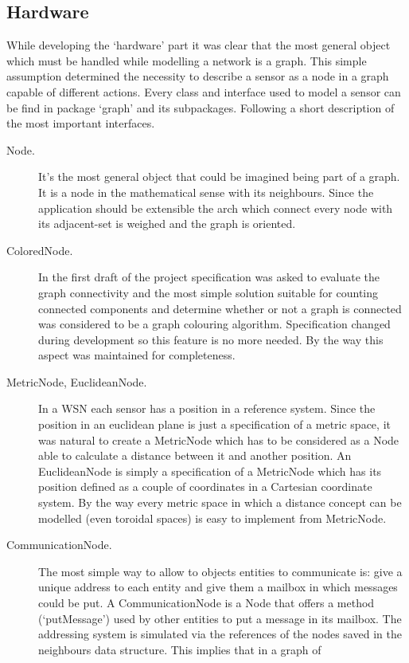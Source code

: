\subsection{Hardware}
While developing the `hardware' part it was clear that the most general object
which must be handled while modelling a network is a graph. This simple
assumption determined the necessity to describe a sensor as a node in a graph
capable of different actions.
Every class and interface used to model a sensor can be find in package `graph'
and its subpackages.
Following a short description of the most important interfaces.
\begin{description}
  \item[Node.] It's the most general object that could be imagined being
  part of a graph. It is a node in the mathematical sense with its 
  neighbours. Since the application should be extensible the arch which connect
  every node with its adjacent-set is weighed and the graph is oriented.
  \item[ColoredNode.] In the first draft of the project specification
  was asked to evaluate the graph connectivity and the most simple
  solution suitable for counting connected components and determine whether or 
  not a graph is connected was considered to be a graph colouring algorithm. 
  Specification changed during development so this feature is no more needed. 
  By the way this aspect was maintained for completeness.
  \item[MetricNode, EuclideanNode.] In a WSN each sensor has a position
  in a reference system. Since the position in an euclidean plane is just a 
  specification of a metric space, it was natural to create a MetricNode which
  has to be considered as a Node able to calculate a distance between it and 
  another position. An EuclideanNode is simply a specification of a MetricNode
  which has its position defined as a couple of coordinates in a Cartesian
  coordinate system. By the way every metric space in which a distance concept
  can be modelled (even toroidal spaces) is easy to implement from MetricNode.
  \item [CommunicationNode.] The most simple way to allow to objects
  entities to communicate is: give a unique address to each entity and give 
  them a mailbox in which messages could be put. A CommunicationNode is a Node
  that offers a method (`putMessage') used by other entities to put a message in its
  mailbox. The addressing system is simulated via the references of the nodes
  saved in the neighbours data structure. This implies that in a graph of

\end{description}
